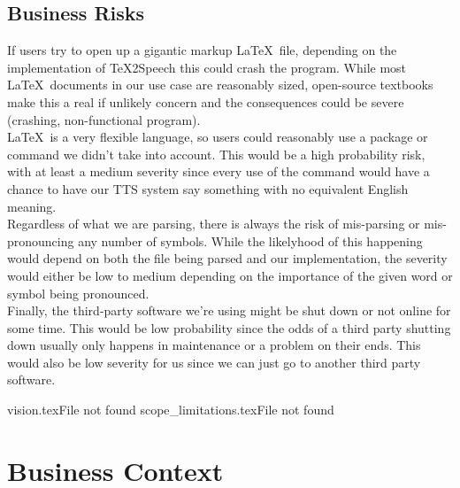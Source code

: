 \documentclass[letterpaper,12pt]{article}
\begin{document}
\subsection{Business Risks}
If users try to open up a gigantic markup \LaTeX\ file, depending on the implementation of \TeX 2Speech this could crash the program. While most \LaTeX\ documents in our use case are reasonably sized, open-source textbooks make this a real if unlikely concern and the consequences could be severe (crashing, non-functional program). \\

\noindent \LaTeX\ is a very flexible language, so users could reasonably use a package or command we didn’t take into account. This would be a high probability risk, with at least a medium severity since every use of the command would have a chance to have our TTS system say something with no equivalent English meaning.\\

\noindent Regardless of what we are parsing, there is always the risk of mis-parsing or mis-pronouncing any number of symbols. While the likelyhood of this happening would depend on both the file being parsed and our implementation, the severity would either be low to medium depending on the importance of the given word or symbol being pronounced.\\

\noindent Finally, the third-party software we’re using might be shut down or not online for some time. This would be low probability since the odds of a third party shutting down usually only happens in maintenance or a problem on their ends. This would also be low severity for us since we can just go to another third party software. 

vision.texFile not found 
scope_limitations.texFile not found 

\section{Business Context}
\end{document}
